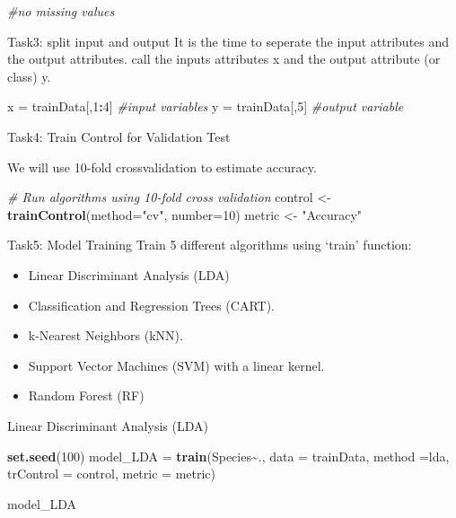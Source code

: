 \documentclass[
]{article}
\newenvironment{Shaded}{\begin{snugshade}}{\end{snugshade}}
\newcommand{\AttributeTok}[1]{\textcolor[rgb]{0.13,0.29,0.53}{#1}}
\newcommand{\CommentTok}[1]{\textcolor[rgb]{0.56,0.35,0.01}{\textit{#1}}}
\newcommand{\DecValTok}[1]{\textcolor[rgb]{0.00,0.00,0.81}{#1}}
\newcommand{\FunctionTok}[1]{\textcolor[rgb]{0.13,0.29,0.53}{\textbf{#1}}}
\newcommand{\NormalTok}[1]{#1}
\newcommand{\OtherTok}[1]{\textcolor[rgb]{0.56,0.35,0.01}{#1}}
\newcommand{\SpecialCharTok}[1]{\textcolor[rgb]{0.81,0.36,0.00}{\textbf{#1}}}
\newcommand{\StringTok}[1]{\textcolor[rgb]{0.31,0.60,0.02}{#1}}
\providecommand{\tightlist}{%
  \setlength{\itemsep}{0pt}\setlength{\parskip}{0pt}}
\begin{document}
\begin{Shaded}
\begin{Highlighting}[]
\CommentTok{\#no missing values}
\end{Highlighting}
\end{Shaded}

Task3: split input and output It is the time to seperate the input
attributes and the output attributes. call the inputs attributes x and
the output attribute (or class) y.

\begin{Shaded}
\begin{Highlighting}[]
\NormalTok{x }\OtherTok{=}\NormalTok{ trainData[,}\DecValTok{1}\SpecialCharTok{:}\DecValTok{4}\NormalTok{] }\CommentTok{\#input variables}
\NormalTok{y }\OtherTok{=}\NormalTok{ trainData[,}\DecValTok{5}\NormalTok{] }\CommentTok{\#output variable}
\end{Highlighting}
\end{Shaded}

Task4: Train Control for Validation Test

We will use 10-fold crossvalidation to estimate accuracy.

\begin{Shaded}
\begin{Highlighting}[]
\CommentTok{\# Run algorithms using 10{-}fold cross validation}
\NormalTok{control }\OtherTok{\textless{}{-}} \FunctionTok{trainControl}\NormalTok{(}\AttributeTok{method=}\StringTok{"cv"}\NormalTok{, }\AttributeTok{number=}\DecValTok{10}\NormalTok{)}
\NormalTok{metric }\OtherTok{\textless{}{-}} \StringTok{"Accuracy"}
\end{Highlighting}
\end{Shaded}

Task5: Model Training Train 5 different algorithms using `train'
function:

\begin{itemize}
\tightlist
\item
  Linear Discriminant Analysis (LDA)
\item
  Classification and Regression Trees (CART).
\item
  k-Nearest Neighbors (kNN).
\item
  Support Vector Machines (SVM) with a linear kernel.
\item
  Random Forest (RF)
\end{itemize}

Linear Discriminant Analysis (LDA)

\begin{Shaded}
\begin{Highlighting}[]
\FunctionTok{set.seed}\NormalTok{(}\DecValTok{100}\NormalTok{)}
\NormalTok{model\_LDA }\OtherTok{=} \FunctionTok{train}\NormalTok{(Species}\SpecialCharTok{\textasciitilde{}}\NormalTok{., }\AttributeTok{data =}\NormalTok{ trainData, }\AttributeTok{method =}\StringTok{\textquotesingle{}lda\textquotesingle{}}\NormalTok{, }\AttributeTok{trControl =}\NormalTok{ control, }\AttributeTok{metric =}\NormalTok{ metric)}

\NormalTok{model\_LDA}
\end{Highlighting}
\end{Shaded}
\end{document}
